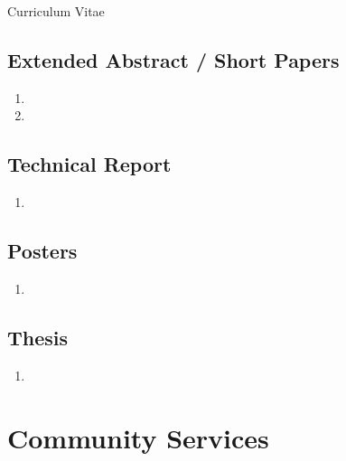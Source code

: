 \documentclass[11pt,a4paper]{article}
\begin{document}
\begin{cv}{Curriculum Vitae}
\subsection{Extended Abstract / Short Papers}
\begin{cvlist}{}
    \item 
        \begin{enumerate}[resume,leftmargin=-2cm]
            \item {}
            \item {}
        \end{enumerate}
\end{cvlist}
\subsection{Technical Report}
\begin{cvlist}{}
    \item 
        \begin{enumerate}[resume,leftmargin=-2cm]
            \item {}
        \end{enumerate}
\end{cvlist}
\subsection{Posters}
\begin{cvlist}{}
    \item 
        \begin{enumerate}[resume,leftmargin=-2cm]
            \item {}
        \end{enumerate}
\end{cvlist}
\subsection{Thesis}
\begin{cvlist}{}
    \item 
        \begin{enumerate}[resume,leftmargin=-2cm]
            \item {}
        \end{enumerate}  
\end{cvlist}

\section{Community Services}

\end{cv}
\end{document}
